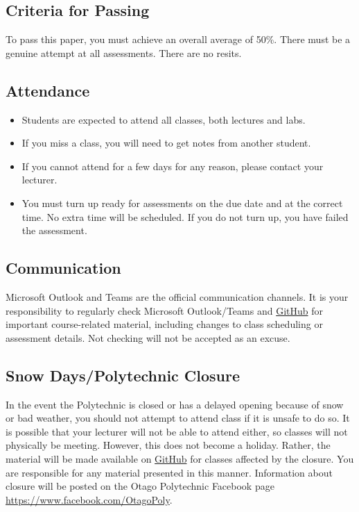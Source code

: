 \documentclass{article}
\begin{document}
\subsection*{Criteria for Passing}
To pass this paper, you must achieve an overall average of 50\%. There must be a genuine attempt at all assessments. There are no resits.

\subsection*{Attendance}
\begin{itemize}
	\item Students are expected to attend all classes, both lectures and labs.
	\item If you miss a class, you will need to get notes from another student.
	\item If you cannot attend for a few days for any reason, please contact your lecturer.
	\item You must turn up ready for assessments on the due date and at the correct time. No extra time will be scheduled. If you do not turn up, you have failed the assessment.
\end{itemize}

\subsection*{Communication}
Microsoft Outlook and Teams are the official communication channels. It is your responsibility to regularly check Microsoft Outlook/Teams and \href{https://github.com/otago-polytechnic-bit-courses/intermediate-app-dev-concepts}{GitHub} for important course-related material, including changes to class scheduling or assessment details. Not checking will not be accepted as an excuse.

\subsection*{Snow Days/Polytechnic Closure}
In the event the Polytechnic is closed or has a delayed opening because of snow or bad weather, you should not attempt to attend class if it is unsafe to do so. It is possible that your lecturer will not be able to attend either, so classes will not physically be meeting. However, this does not become a holiday. Rather, the material will be made available on \href{https://github.com/otago-polytechnic-bit-courses/intermediate-app-dev-concepts}{GitHub} for classes affected by the closure. You are responsible for any material presented in this manner. Information about closure will be posted on the Otago Polytechnic Facebook page \href{https://www.facebook.com/OtagoPoly}{https://www.facebook.com/OtagoPoly}.
\end{document}
